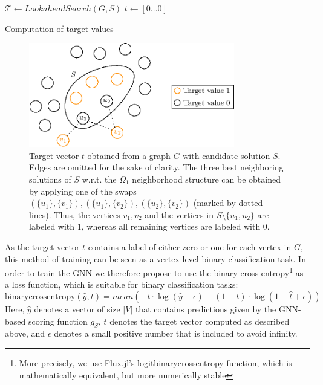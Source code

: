 \documentclass[draft,final]{vutinfth} %
\begin{document}
\begin{algorithm}
    \DontPrintSemicolon
    $\mathcal{T} \gets \mathit{LookaheadSearch}(G, S)$ \;
    $t \gets [0 \dots 0]$ 
    \caption{Computation of target values}
    \label{alg:target-values}
\end{algorithm}

\begin{figure}
    \centering
    \includegraphics[width=0.8\textwidth]{graphics/target_values.eps}
    \caption[]{Target vector $t$ obtained from a graph $G$ with candidate solution $S$. Edges are omitted for the sake of clarity. The three best neighboring solutions of $S$ w.r.t. the $\Omega_1$ neighborhood structure can be obtained by applying one of the swaps $(\{u_1\}, \{v_1\}), (\{u_1\}, \{v_2\}), (\{u_2\}, \{v_2\})$ (marked by dotted lines). Thus, the vertices $v_1, v_2$ and the vertices in $S \setminus \{u_1, u_2\}$ are labeled with 1, whereas all remaining vertices are labeled with 0. }
    \label{fig:target-values}
\end{figure}

As the target vector $t$ contains a label of either zero or one for each vertex in $G$, this method of training can be seen as a vertex level binary classification task. 
In order to train the GNN we therefore propose to use the binary cross entropy\footnote{More precisely, we use Flux.jl's logitbinarycrossentropy function, which is mathematically equivalent, but more numerically stable} as a loss function, which is suitable for binary classification tasks:
\[
    \mathrm{binarycrossentropy}(\hat{y}, t) = \mathit{mean}(-t \cdot \log(\hat{y} + \epsilon) - (1 - t) \cdot \log(1 - \hat{t} + \epsilon))    
\]
Here, $\hat{y}$ denotes a vector of size $|V|$ that contains predictions given by the GNN-based scoring function $g_S$, $t$ denotes the target vector computed as described above, and $\epsilon$ denotes a small positive number that is included to avoid infinity. 
\end{document}
